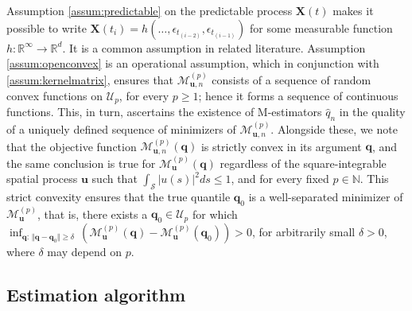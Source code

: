 \documentclass[aos]{imsart}
\theoremstyle{plain}
\theoremstyle{remark}
\def\R{\mathbb{R}}
\def\N{\mathbb{N}}
\newcommand{\Scal}{\mathcal{S}}
\newcommand{\bb}[1]{\boldsymbol{#1}}
\begin{document}
Assumption \ref{assum:predictable} on the predictable process $\bb{X}(t)$ makes it possible to write $\bb{X}(t_i) = h(\dots, \epsilon_{t_{(i-2)}}, \epsilon_{t_{(i-1)}})$ for some measurable function $h: \R^\infty \rightarrow \R^d$. It is a common assumption in related literature. Assumption \ref{assum:openconvex} is an operational assumption, which in conjunction with \ref{assum:kernelmatrix}, ensures that $\mathcal{M}_{\bb{u},n}^{(p)}$  consists of a sequence of random convex functions on $\mathcal{U}_p$, for every $p \geqslant 1$; hence it forms a sequence of continuous functions. This, in turn, ascertains the existence of M-estimators $\hat{q}_n$ in the quality of a uniquely defined sequence of minimizers of $\mathcal{M}_{\bb{u},n}^{(p)}$. Alongside these, we note that the objective function $\mathcal{M}_{\bb{u},n}^{(p)}(\bb{q})$ is strictly convex in its argument $\bb{q}$, and the same conclusion is true for $\mathcal{M}_{\bb{u}}^{(p)}(\bb{q})$ regardless of the square-integrable spatial process $\bb{u}$ such that $\int_{\Scal}\vert u(s)\vert^2 ds \leq 1$, and for every fixed $p \in \N$. This strict convexity ensures that the true quantile $\bb{q}_0$ is a well-separated minimizer of $\mathcal{M}_{\bb{u}}^{(p)}$, that is, there exists a $\bb{q}_0 \in \mathcal{U}_p$ for which $\inf_{\bb{q}: \, \Vert \bb{q} -\bb{q}_0 \Vert \geqslant \delta }\, \left(\mathcal{M}_{\bb{u}}^{(p)} (\bb{q})- \mathcal{M}_{\bb{u}}^{(p)} (\bb{q}_0) \right) >0$, for arbitrarily small $\delta > 0$, where $\delta$ may depend on $p$.



\subsection{Estimation algorithm}
\end{document}
